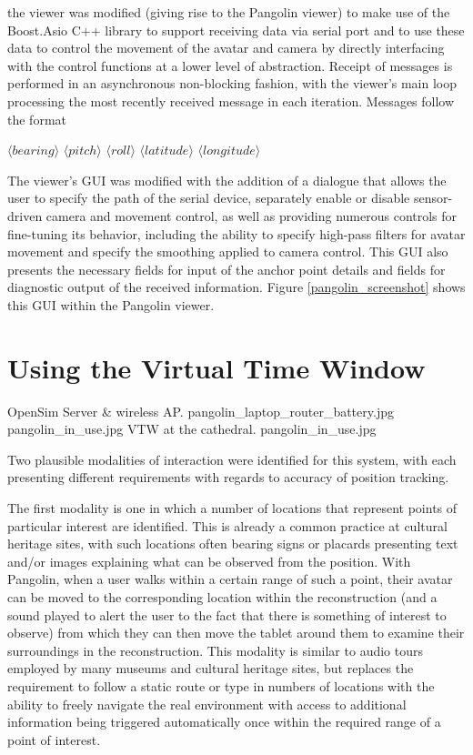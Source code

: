 the viewer was modified (giving rise to the Pangolin viewer) to make use of the Boost.Asio C++ library to support receiving data via serial port and to use these data to control the movement of the avatar and camera by directly interfacing with the control functions at a lower level of abstraction. Receipt of messages is performed in an asynchronous non-blocking fashion, with the viewer's main loop processing the most recently received message in each iteration. Messages follow the format

$\langle bearing \rangle$ $\langle pitch \rangle$ $\langle roll \rangle$ $\langle latitude \rangle$ $\langle longitude \rangle$

The viewer's GUI was modified with the addition of a dialogue that allows the user to specify the path of the serial device, separately enable or disable sensor-driven camera and movement control, as well as providing numerous controls for fine-tuning its behavior, including the ability to specify high-pass filters for avatar movement and specify the smoothing applied to camera control. This GUI also presents the necessary fields for input of the anchor point details and fields for diagnostic output of the received information. Figure \ref{pangolin_screenshot} shows this GUI within the Pangolin viewer.




\section{Using the Virtual Time Window}

 {OpenSim Server \& wireless AP.} {pangolin_laptop_router_battery.jpg}
       {pangolin_in_use.jpg} {VTW at the cathedral.} {pangolin_in_use.jpg}

Two plausible modalities of interaction were identified for this system, with each presenting different requirements with regards to accuracy of position tracking.

The first modality is one in which a number of locations that represent points of particular interest are identified. This is already a common practice at cultural heritage sites, with such locations often bearing signs or placards presenting text and/or images explaining what can be observed from the position. With Pangolin, when a user walks within a certain range of such a point, their avatar can be moved to the corresponding location within the reconstruction (and a sound played to alert the user to the fact that there is something of interest to observe) from which they can then move the tablet around them to examine their surroundings in the reconstruction. This modality is similar to audio tours employed by many museums and cultural heritage sites, but replaces the requirement to follow a static route or type in numbers of locations with the ability to freely navigate the real environment with access to additional information being triggered automatically once within the required range of a point of interest.

